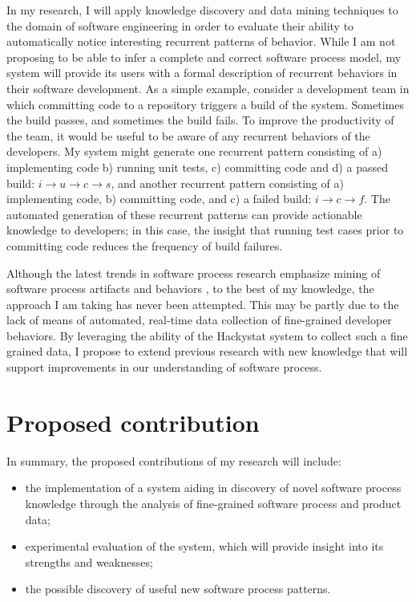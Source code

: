 In my research, I will apply knowledge discovery and data mining techniques to the domain of software engineering in order to evaluate their ability to automatically notice interesting recurrent patterns of behavior. While I am not proposing to be able to infer a complete and correct software process model, my system will provide its users with a formal description of recurrent behaviors in their software development. As a simple example, consider a development team in which committing code to a repository triggers a build of the system. Sometimes the build passes, and sometimes the build fails. To improve the productivity of the team, it would be useful to be aware of any recurrent behaviors of the developers. My system might generate one recurrent pattern consisting of a) implementing code b) running unit tests, c) committing code and d) a passed build: $i \rightarrow u \rightarrow c \rightarrow s $, and another recurrent pattern consisting of a) implementing code, b) committing code, and c) a failed build: $i \rightarrow c \rightarrow f $. The automated generation of these recurrent patterns can provide actionable knowledge to developers; in this case, the insight that running test cases prior to committing code reduces the frequency of build failures.

Although the latest trends in software process research emphasize mining of software process artifacts and behaviors \cite{citeulike:5043664} \cite{citeulike:1885717} \cite{citeulike:5112229} \cite{citeulike:1885717}, to the best of my knowledge, the approach I am taking has never been attempted. This may be partly due to the lack of means of automated, real-time data collection of fine-grained developer behaviors. By leveraging the ability of the Hackystat system \cite{citeulike:4041809} to collect such a fine grained data, I propose to extend previous research with new knowledge that will support improvements in our understanding of software process.

\section{Proposed contribution}
In summary, the proposed contributions of my research will include: 
\begin{itemize}
	\item the implementation of a system aiding in discovery of novel software process knowledge through the analysis of fine-grained software process and product data;
	\item experimental evaluation of the system, which will provide insight into its strengths and weaknesses;
	\item the possible discovery of useful new software process patterns.
\end{itemize}

